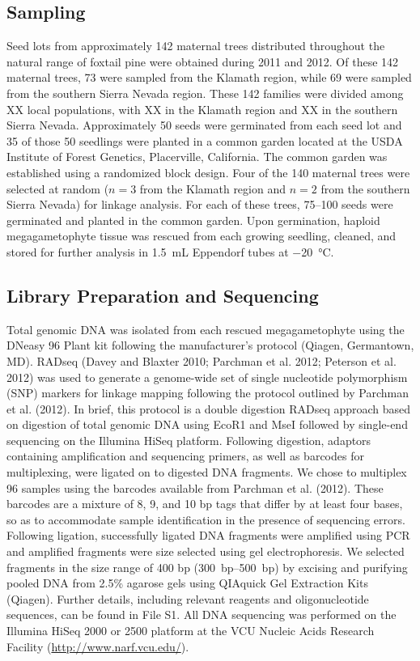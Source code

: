 \documentclass[11pt]{article}
\begin{document}
\subsection{Sampling}
Seed lots from approximately 142 maternal trees distributed throughout the natural range 
of foxtail pine were obtained during 2011 and 2012. Of these 142 maternal trees, 73 were sampled from the 
Klamath region, while 69 were sampled from the southern Sierra Nevada region. These 142 families were
divided among XX local populations, with XX in the Klamath region and XX in the southern Sierra Nevada.
Approximately 50 seeds were germinated from each seed lot and 35 of those 50 seedlings were planted in a 
common garden located at the USDA Institute of Forest Genetics, Placerville, California. The 
common garden was established using a randomized block design.
Four of the 140 maternal trees were selected at random ($n = 3$ from the Klamath region and $n = 2$ from 
the southern Sierra Nevada) for linkage analysis. For each of these trees, \SIrange{75}{100}{} 
seeds were germinated and planted in the common garden. Upon germination, haploid 
megagametophyte tissue was rescued from each growing seedling, cleaned, and stored for further 
analysis in \SI{1.5}{\mL} Eppendorf tubes at \SI{-20}{\celsius}.


\subsection*{Library Preparation and Sequencing}
Total genomic DNA was isolated from each rescued megagametophyte using the DNeasy 96 Plant 
kit following the manufacturer’s protocol (Qiagen, Germantown, MD). RADseq (Davey and Blaxter 2010; Parchman et al. 2012; Peterson et al. 2012) 
was used to generate a genome-wide set of 
single nucleotide polymorphism (SNP) markers for linkage mapping following the protocol 
outlined by Parchman et al. (2012). In brief, this protocol is a double digestion RADseq 
approach based on digestion of total genomic DNA using EcoR1 and MseI followed by single-end 
sequencing on the Illumina HiSeq platform. Following digestion, adaptors 
containing amplification and sequencing primers, as well as barcodes for multiplexing, 
were ligated on to digested DNA fragments. We chose to multiplex 96 samples using the 
barcodes available from Parchman et al. (2012). These barcodes are a mixture of 8, 9, and 
10 bp tags that differ by at least four bases, so as to accommodate sample identification in the 
presence of sequencing errors. Following ligation, successfully ligated DNA fragments were 
amplified using PCR and amplified fragments were size selected using gel electrophoresis. We selected 
fragments in the size range of 400 bp (\SIrange{300}{500}{bp}) by excising and purifying pooled DNA from 2.5\% 
agarose gels using QIAquick Gel Extraction Kits (Qiagen). Further details, including relevant reagents and 
oligonucleotide sequences, can be found in File S1. All DNA sequencing was performed on the Illumina HiSeq 2000 or 2500
platform at the VCU Nucleic Acids Research Facility (\url{http://www.narf.vcu.edu/}).
\end{document}
